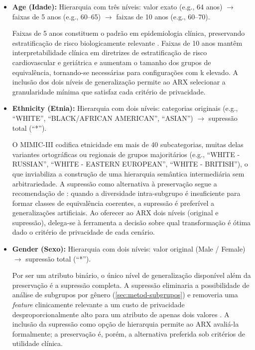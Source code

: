 \begin{itemize}
    \item \textbf{Age (Idade):} Hierarquia com três níveis: valor exato (e.g., 64 anos) $\rightarrow$ faixas de 5 anos (e.g., 60--65) $\rightarrow$ faixas de 10 anos (e.g., 60--70).

    Faixas de 5 anos constituem o padrão em epidemiologia clínica, preservando estratificação de risco biologicamente relevante \cite{ElEmam2013, Lee2017}. Faixas de 10 anos mantêm interpretabilidade clínica em diretrizes de estratificação de risco cardiovascular e geriátrica \cite{Pilgram2024} e aumentam o tamanho dos grupos de equivalência, tornando-se necessárias para configurações com k elevado. A inclusão dos dois níveis de generalização permite ao ARX selecionar a granularidade mínima que satisfaz cada critério de privacidade.

    \item \textbf{Ethnicity (Etnia):} Hierarquia com dois níveis: categorias originais (e.g., ``WHITE'', ``BLACK/AFRICAN AMERICAN'', ``ASIAN'') $\rightarrow$ supressão total (``*'').

    O MIMIC-III codifica etnicidade em mais de 40 subcategorias, muitas delas variantes ortográficas ou regionais de grupos majoritários (e.g., ``WHITE - RUSSIAN'', ``WHITE - EASTERN EUROPEAN'', ``WHITE - BRITISH''), o que inviabiliza a construção de uma hierarquia semântica intermediária sem arbitrariedade. A supressão como alternativa à preservação segue a recomendação de : quando a diversidade intra-subgrupo é insuficiente para formar classes de equivalência coerentes, a supressão é preferível a generalizações artificiais. Ao oferecer ao ARX dois níveis (original e supressão), delega-se à ferramenta a decisão sobre qual transformação é ótima dado o critério de privacidade de cada cenário.

    \item \textbf{Gender (Sexo):} Hierarquia com dois níveis: valor original (Male / Female) $\rightarrow$ supressão total (``*'').

    Por ser um atributo binário, o único nível de generalização disponível além da preservação é a supressão completa. A supressão eliminaria a possibilidade de análise de subgrupos por gênero (\autoref{sec:metod-subgrupos}) e removeria uma \textit{feature} clinicamente relevante a um custo de privacidade desproporcionalmente alto para um atributo de apenas dois valores \cite{Lee2017}. A inclusão da supressão como opção de hierarquia permite ao ARX avaliá-la formalmente; a preservação é, porém, a alternativa preferida sob critérios de utilidade clínica.
\end{itemize}

